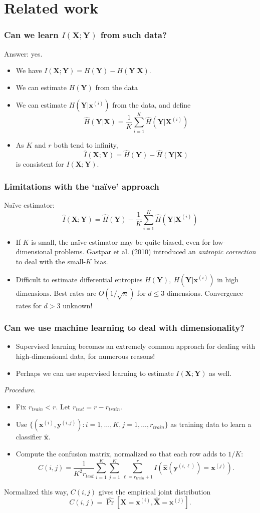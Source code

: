 \documentclass{beamer}
\newcommand{\bx}{\boldsymbol{x}}
\newcommand{\by}{\boldsymbol{y}}
\newcommand{\bX}{\boldsymbol{X}}
\newcommand{\bY}{\boldsymbol{Y}}
\begin{document}
\section{Related work}

\begin{frame}
\frametitle{Can we learn $I(\bX; \bY)$ from such data?}
Answer: yes.
\begin{itemize}
\item We have $I(\bX; \bY) = H(\bY) - H(\bY|\bX)$.
\item We can estimate $H(\bY)$ from the data
\item We can estimate $H(\bY| \bx^{(i)})$ from the data, and define
\[
\hat{H}(\bY|\bX) = \frac{1}{K}\sum_{i=1}^K \hat{H}(\bY| \bX^{(i)})
\]
\item As $K$ and $r$ both tend to infinity, 
\[
\hat{I}(\bX; \bY) = \hat{H}(\bY) - \hat{H}(\bY|\bX)
\]
is consistent for $I(\bX; \bY)$.
\end{itemize}
\end{frame}

\begin{frame}
\frametitle{Limitations with the `na\"{i}ve' approach}
Na\"{i}ve estimator:
\[
\hat{I}(\bX; \bY) = \hat{H}(\bY) - \frac{1}{K}\sum_{i=1}^K \hat{H}(\bY| \bX^{(i)})
\]
\begin{itemize}
\item If $K$ is small, the na\"{i}ve estimator may be quite biased, even for low-dimensional problems.
Gastpar et al. (2010) introduced an \emph{antropic correction} to deal with the small-$K$ bias.
\item Difficult to estimate differential entropies $H(\bY),\
  H(\bY|\bx^{(i)})$ in high dimensions.  Best rates are
  $O(1/\sqrt{n})$ for $d \leq 3$ dimensions.  Convergence rates for $d > 3$
  unknown!
\end{itemize}
\end{frame}

\begin{frame}
\frametitle{Can we use machine learning to deal with dimensionality?}
\begin{itemize}
\item Supervised learning becomes an extremely common approach for dealing with high-dimensional data, for numerous reasons!
\item Perhaps we can use supervised learning to estimate $I(\bX; \bY)$ as well.
\end{itemize}
\emph{Procedure.}
\begin{itemize}
\item Fix $r_{train} < r$.  Let $r_{test} = r - r_{train}$.
\item Use $\{(\bx^{(i)}, \by^{(i, j)}): i = 1,\hdots, K, j = 1,\hdots, r_{train}\}$ as training data to learn a classifier $\hat{\bx}$.
\item Compute the confusion matrix, normalized so that each row adds to $1/K$:
\[
C(i, j) = \frac{1}{K^2 r_{test}} \sum_{i=1}^K \sum_{j=1}^K  \sum_{\ell=r_{train} + 1}^r I(\hat{\bx}(\by^{(i,\ell)}) = \bx^{(j)}).
\]
\end{itemize}
Normalized this way, $C(i, j)$ gives the empirical joint distribution
\[
C(i, j) = \hat{\Pr}[\bX = \bx^{(i)}, \hat{\bX} = \bx^{(j)}].
\]
\end{frame}
\end{document}
